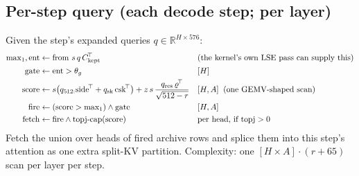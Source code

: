 \documentclass[11pt]{article}
\newcommand{\kept}{\mathrm{kept}}
\begin{document}
\subsection{Per-step query (each decode step; per layer)}
Given the step's expanded queries $q \in \mathbb{R}^{H\times 576}$:
\begin{align}
\mathrm{max}_1, \mathrm{ent} &\gets \text{from } s\,q\,C_{\kept}^{\!\top}
&&\text{(the kernel's own LSE pass can supply this)}\notag\\
\mathrm{gate} &\gets \mathrm{ent} > \theta_g &&[H]\notag\\
\mathrm{score} &\gets s\big(q_{512:}\mathrm{side}^{\!\top} +
q_{\mathrm{sk}}\,\mathrm{csk}^{\!\top}\big) +
z\, s\,\frac{q_{\mathrm{res}}\,\varrho^{\!\top}}{\sqrt{512-r}}
&&[H,A] \;\;\text{(one GEMV-shaped scan)}\notag\\
\mathrm{fire} &\gets (\mathrm{score} > \mathrm{max}_1) \wedge \mathrm{gate}
&&[H,A]\notag\\
\mathrm{fetch} &\gets \mathrm{fire} \wedge \mathrm{topj\text{-}cap}(\mathrm{score})
&&\text{per head, if } \mathrm{topj}>0\notag
\end{align}
Fetch the union over heads of fired archive rows and splice them into this
step's attention as one extra split-KV partition. Complexity: one
$[H \times A] \cdot (r{+}65)$ scan per layer per step.
\end{document}

